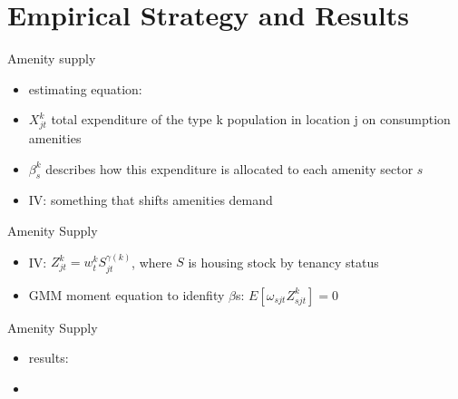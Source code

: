 \section{Empirical Strategy and Results}

\begin{frame}{Amenity supply}
    \begin{itemize}
        \item estimating equation:
        \begin{figure}
            \centering
            \caption{}
            \label{fig:photo}
        \end{figure}
        \item $X^{k}_{jt}$ total expenditure of the type k population in location j on consumption amenities
        \item $\beta^{k}_{s}$ describes how this expenditure is allocated to each amenity sector $s$
        \item IV: something that shifts amenities demand
    \end{itemize}
\end{frame}

\begin{frame}{Amenity Supply}
    \begin{itemize}
        \item IV: $Z^{k}_{jt} = w_{t}^{k} S_{jt}^{\gamma(k)}$, where $S$ is housing stock by tenancy status  
        \item GMM moment equation to idenfity $\beta$s: $E[\omega_{sjt} Z^{k}_{sjt}] = 0$
    \end{itemize}
\end{frame}

\begin{frame}{Amenity Supply}
    \begin{itemize}
        \item results:
        \begin{figure}
            \centering
            \caption{}
            \label{fig:photo}
        \end{figure}
        \item 
    \end{itemize}
\end{frame}

